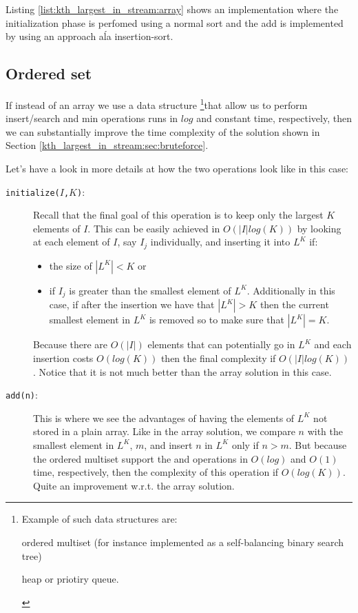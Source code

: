 Listing \ref{list:kth_largest_in_stream:array} shows an implementation where the initialization
phase is perfomed using a normal sort and the add is implemented by using an approach a\' la
insertion-sort.



\subsection{Ordered set}
\label{kth_largest_in_stream:sec:map}
If instead of an array we use a data structure \footnote{Example of such data structures are:
\begin{enumerate*}
	\item ordered multiset (for instance implemented as a self-balancing binary search tree)
	\item heap or priotiry queue. \end{enumerate*}}that allow us to perform insert/search and min
operations runs in $log$ and constant time, respectively, then we can  substantially improve the
time complexity of the solution shown in Section \ref{kth_largest_in_stream:sec:bruteforce}.

Let's have a look in more details at how the two operations look like in this case:
\begin{description}
	\item[\texttt{initialize($I$,$K$)}:] Recall that the final goal of this operation is to keep
	only  the largest $K$ elements of $I$. This can be easily achieved in $O(|I|log(K))$ by looking
	at each element of $I$, say $I_j$ individually,  and inserting it into $L^K$ if:
	\begin{itemize}
		\item the size of $|L^K| < K$ or 
		\item if $I_j$ is greater than the smallest element of $L^K$. Additionally in this case, if
		after the insertion we have that $|L^K|  > K$ then the current smallest element in $L^K$ is
		removed so to make sure that $|L^K|=K$.
	\end{itemize}
	Because there are $O(|I|)$ elements that can potentially go in $L^K$ and each insertion costs
	$O(log(K))$ then the final complexity if $O(|I|log(K))$. Notice that it is not much better than
	the array solution in this case.
	\item [\texttt{add(n)}:] This is where we see the advantages of having the elements of  $L^K$
	not stored in a plain array. Like in the array solution, we compare $n$ with the smallest
	element in $L^K$, $m$, and insert $n$ in $L^K$ only if $n>m$. But because the ordered multiset
	support the  and  operations in $O(log)$ and $O(1)$ time,
	respectively, then the complexity of this operation if $O(log(K))$. Quite an improvement w.r.t.
	the array solution.
\end{description}


